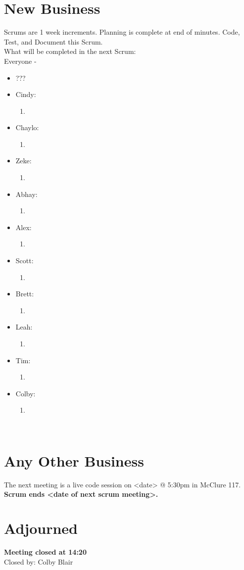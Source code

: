 \documentclass[12pt]{article}
\begin{document}
\section{New Business}
Scrums are 1 week increments. Planning is complete at end of minutes. Code, Test, and Document this Scrum.\\
What will be completed in the next Scrum:\\
Everyone - \\
\begin{itemize}
	\item ???
\end{itemize}
\begin{itemize}
\item Cindy:
\begin{enumerate}
	\item
\end{enumerate}
\item Chaylo:
\begin{enumerate}
	\item
\end{enumerate}
\item Zeke:
\begin{enumerate}
	\item
\end{enumerate}
\item Abhay:
\begin{enumerate}
	\item
\end{enumerate}
\item Alex:
\begin{enumerate}
	\item
\end{enumerate}
\item Scott:
\begin{enumerate}
	\item
\end{enumerate}
\item Brett:
\begin{enumerate}
	\item
\end{enumerate}
\item Leah:
\begin{enumerate}
	\item
\end{enumerate}
\item Tim:
\begin{enumerate}
	\item
\end{enumerate}
\item Colby:
\begin{enumerate}
	\item
\end{enumerate}
\end{itemize}
\\  
\section{Any Other Business}
The next meeting is a live code session on <date> @ 5:30pm in McClure 117. \\
\textbf{Scrum ends <date of next scrum meeting>.}
\\
\section{Adjourned}
\textbf{Meeting closed at 14:20} \\
Closed by: Colby Blair \\
\end{document}
